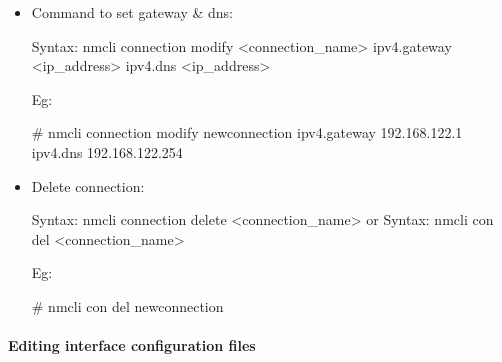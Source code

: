 \begin{flushleft}
\begin{itemize}
\begin{itemize}
		\bigskip
		\bigskip
	
		\item Command to set gateway \& dns:
		\begin{tcolorbox}[breakable,notitle,boxrule=-0pt,colback=pink,colframe=pink]
			\color{black}
			\font=9pt
			Syntax: nmcli connection modify <connection\_name> ipv4.gateway <ip\_address> ipv4.dns <ip\_address>
			\font=4pt
		\end{tcolorbox}
		Eg:	
		\begin{tcolorbox}[breakable,notitle,boxrule=-0pt,colback=black,colframe=black]
			\color{green}
			\font=9pt
			\# nmcli connection modify newconnection ipv4.gateway 192.168.122.1 ipv4.dns 192.168.122.254
			\font=4pt
		\end{tcolorbox}
	
		\bigskip
		\bigskip
		\item Delete connection:
		\begin{tcolorbox}[breakable,notitle,boxrule=-0pt,colback=pink,colframe=pink]
			\color{black}
			\font=9pt
			Syntax: nmcli connection delete <connection\_name>
			\newline
			or
			\newline
			Syntax: nmcli con del <connection\_name>
			\font=4pt
		\end{tcolorbox}
		
		Eg:	
		\begin{tcolorbox}[breakable,notitle,boxrule=-0pt,colback=black,colframe=black]
			\color{green}
			\font=9pt
			\# nmcli con del newconnection
			\font=4pt
		\end{tcolorbox}
			
	
	
	\end{itemize}
	
	
\end{itemize}




\newpage

\paragraph{Editing interface configuration files}


\end{flushleft}
